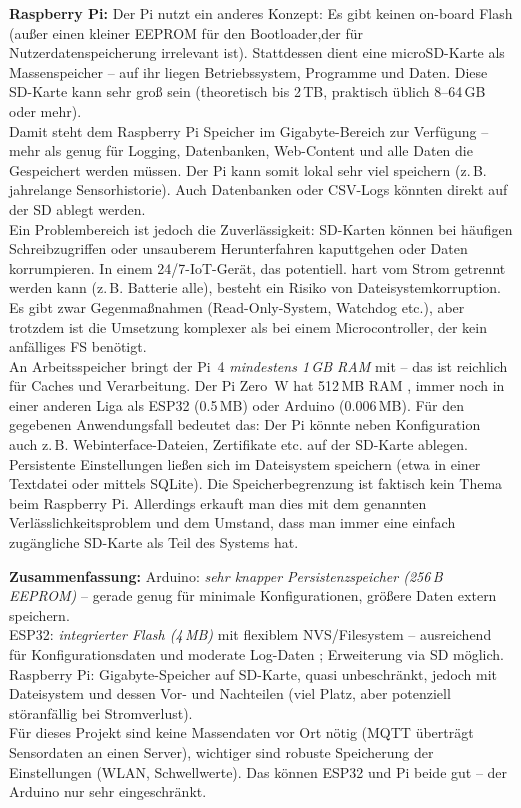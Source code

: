 \noindent\textbf{Raspberry Pi:} Der Pi nutzt ein anderes Konzept: Es gibt keinen on-board Flash (außer einen kleiner EEPROM für den Bootloader,der für Nutzerdatenspeicherung irrelevant ist). Stattdessen dient eine microSD-Karte als Massenspeicher \autocite{esp32_comparison} – auf ihr liegen Betriebssystem, Programme und Daten. Diese SD-Karte kann sehr groß sein (theoretisch bis 2\,TB, praktisch üblich 8–64\,GB oder mehr).
\\
Damit steht dem Raspberry Pi Speicher im Gigabyte-Bereich zur Verfügung – mehr als genug für Logging, Datenbanken, Web-Content und alle Daten die Gespeichert werden müssen. Der Pi kann somit lokal sehr viel speichern (z.\,B. jahrelange Sensorhistorie). Auch Datenbanken oder CSV-Logs könnten direkt auf der SD ablegt werden. 
\\
Ein Problembereich ist jedoch die Zuverlässigkeit: SD-Karten können bei häufigen Schreibzugriffen oder unsauberem Herunterfahren kaputtgehen oder Daten korrumpieren. In einem 24/7-IoT-Gerät, das potentiell. hart vom Strom getrennt werden kann (z.\,B. Batterie alle), besteht ein Risiko von Dateisystemkorruption. Es gibt zwar Gegenmaßnahmen (Read-Only-System, Watchdog etc.), aber trotzdem ist die Umsetzung komplexer als bei einem Microcontroller, der kein anfälliges FS benötigt.
\\
An Arbeitsspeicher bringt der Pi~4 \textit{mindestens 1\,GB RAM} mit – das ist reichlich für Caches und Verarbeitung. Der Pi Zero~W hat 512\,MB RAM \autocite{raspberry_pi_w_datasheet}, immer noch in einer anderen Liga als ESP32 (0.5\,MB) oder Arduino (0.006\,MB). 
Für den gegebenen Anwendungsfall bedeutet das: Der Pi könnte neben Konfiguration auch z.\,B. Webinterface-Dateien, Zertifikate etc. auf der SD-Karte ablegen. Persistente Einstellungen ließen sich im Dateisystem speichern (etwa in einer Textdatei oder mittels SQLite). Die Speicherbegrenzung ist faktisch kein Thema beim Raspberry Pi. Allerdings erkauft man dies mit dem genannten Verlässlichkeitsproblem und dem Umstand, dass man immer eine einfach zugängliche SD-Karte als Teil des Systems hat.


\vspace{5mm}

\noindent\textbf{Zusammenfassung:} Arduino: \textit{sehr knapper Persistenzspeicher (256\,B EEPROM)} \autocite{esp_datasheet} – gerade genug für minimale Konfigurationen, größere Daten extern speichern. 
\\
ESP32: \textit{integrierter Flash (4\,MB)} mit flexiblem NVS/Filesystem – ausreichend für Konfigurationsdaten und moderate Log-Daten \autocite{esp_nvs}; Erweiterung via SD möglich. 
\\
Raspberry Pi: Gigabyte-Speicher auf SD-Karte, quasi unbeschränkt, jedoch mit Dateisystem und dessen Vor- und Nachteilen (viel Platz, aber potenziell störanfällig bei Stromverlust). 
\\Für dieses Projekt sind keine Massendaten vor Ort nötig (MQTT überträgt Sensordaten an einen Server), wichtiger sind robuste Speicherung der Einstellungen (WLAN, Schwellwerte). Das können ESP32 und Pi beide gut – der Arduino nur sehr eingeschränkt.

